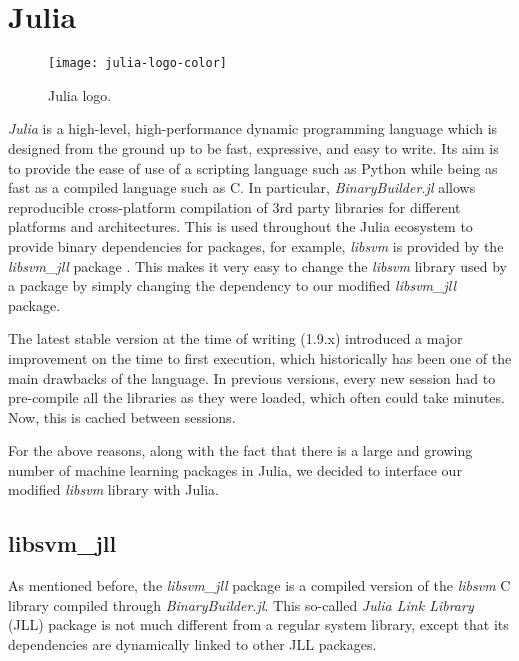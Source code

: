 \section{Julia}%
\label{sub:impl_julia}

\begin{wrapfigure}{r}{.40\textwidth}
    \texttt{[image: julia-logo-color]}
    \caption{Julia logo.\protect\footnotemark}
    \label{fig:julia_logo}
\end{wrapfigure}

\emph{Julia} \cite{bezanson2017julia} is a high-level, high-performance dynamic
programming language which is designed from the ground up to be fast,
expressive, and easy to write. Its aim is to provide the ease of use of a
scripting language such as Python while being as fast as a compiled language
such as C. In particular, \emph{BinaryBuilder.jl}
\cite{JLLPackagesBinaryBuilder} allows reproducible cross-platform compilation
of 3rd party libraries for different platforms and architectures. This is used
throughout the Julia ecosystem to provide binary dependencies for packages, for
example, \emph{libsvm} is provided by the \emph{libsvm\_jll} package
\cite{LibsvmJllJl2022}. This makes it very easy to change the \emph{libsvm}
library used by a package by simply changing the dependency to our modified
\emph{libsvm\_jll} package.

The latest stable version at the time of writing (1.9.x) introduced a major
improvement on the time to first execution, which historically has been one of
the main drawbacks of the language. In previous versions, every new session had
to pre-compile all the libraries as they were loaded, which often could take
minutes. Now, this is cached between sessions\cite{JuliaV1Release}.

For the above reasons, along with the fact that there is a large and growing
number of machine learning packages in Julia, we decided to interface our
modified \emph{libsvm} library with Julia.

\subsection{libsvm\_jll}

As mentioned before, the \emph{libsvm\_jll} package is a compiled version of the
\emph{libsvm} C library compiled through \emph{BinaryBuilder.jl}. This so-called
\emph{Julia Link Library} (JLL) package is not much different from a regular
system library, except that its dependencies are dynamically linked to other JLL
packages.

